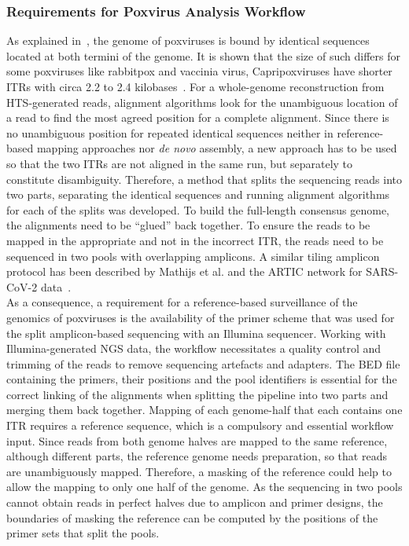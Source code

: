 \subsubsection{Requirements for Poxvirus Analysis Workflow}
As explained in~, the genome of poxviruses is bound by identical sequences located at both termini of the genome. It is shown that the size of such differs for some poxviruses like rabbitpox and vaccinia virus, Capripoxviruses have shorter \acp{ITR} with circa 2.2 to 2.4 kilobases~\cite{wittek1978inverted}. For a whole-genome reconstruction from \ac{HTS}-generated reads, alignment algorithms look for the unambiguous location of a read to find the most agreed position for a complete alignment. Since there is no unambiguous position for repeated identical sequences neither in reference-based mapping approaches nor \textit{de novo} assembly, a new approach has to be used so that the two \acp{ITR} are not aligned in the same run, but separately to constitute disambiguity. Therefore, a method that splits the sequencing reads into two parts, separating the identical sequences and running alignment algorithms for each of the splits was developed. To build the full-length consensus genome, the alignments need to be ``glued'' back together. To ensure the reads to be mapped in the appropriate and not in the incorrect \ac{ITR}, the reads need to be sequenced in two pools with overlapping amplicons. A similar tiling amplicon protocol has been described by Mathijs et al. and the ARTIC network for \ac{SARS-CoV-2} data~\cite{tyson2020improvements, mathijs2022robust}. \\
As a consequence, a requirement for a reference-based surveillance of the genomics of poxviruses is the availability of the primer scheme that was used for the split amplicon-based sequencing with an Illumina sequencer. Working with Illumina-generated \ac{NGS} data, the workflow necessitates a quality control and trimming of the reads to remove sequencing artefacts and adapters. The \ac{BED} file containing the primers, their positions and the pool identifiers is essential for the correct linking of the alignments when splitting the pipeline into two parts and merging them back together. Mapping of each genome-half that each contains one \ac{ITR} requires a reference sequence, which is a compulsory and essential workflow input. Since reads from both genome halves are mapped to the same reference, although different parts, the reference genome needs preparation, so that reads are unambiguously mapped. Therefore, a masking of the reference could help to allow the mapping to only one half of the genome. As the sequencing in two pools cannot obtain reads in perfect halves due to amplicon and primer designs, the boundaries of masking the reference can be computed by the positions of the primer sets that split the pools. \\
